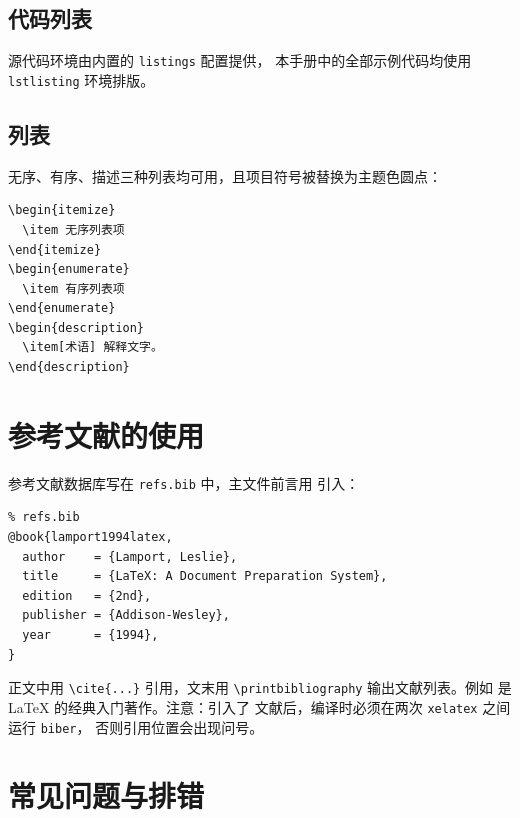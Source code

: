 \subsection{代码列表}

源代码环境由内置的 \texttt{listings} 配置提供，
本手册中的全部示例代码均使用 \texttt{lstlisting} 环境排版。

\subsection{列表}

无序、有序、描述三种列表均可用，且项目符号被替换为主题色圆点：

\begin{lstlisting}
\begin{itemize}
  \item 无序列表项
\end{itemize}
\begin{enumerate}
  \item 有序列表项
\end{enumerate}
\begin{description}
  \item[术语] 解释文字。
\end{description}
\end{lstlisting}

\section{参考文献的使用}

参考文献数据库写在 \texttt{refs.bib} 中，主文件前言用
\verb|| 引入：

\begin{lstlisting}
% refs.bib
@book{lamport1994latex,
  author    = {Lamport, Leslie},
  title     = {LaTeX: A Document Preparation System},
  edition   = {2nd},
  publisher = {Addison-Wesley},
  year      = {1994},
}
\end{lstlisting}

正文中用 \verb|\cite{...}| 引用，文末用
\verb|\printbibliography| 输出文献列表。例如
\cite{lamport1994latex} 是 LaTeX 的经典入门著作。注意：引入了
文献后，编译时必须在两次 \texttt{xelatex} 之间运行 \texttt{biber}，
否则引用位置会出现问号。

\section{常见问题与排错}

